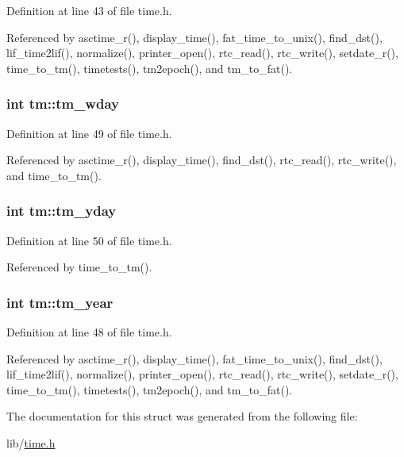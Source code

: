 Definition at line 43 of file time.\+h.



Referenced by asctime\+\_\+r(), display\+\_\+time(), fat\+\_\+time\+\_\+to\+\_\+unix(), find\+\_\+dst(), lif\+\_\+time2lif(), normalize(), printer\+\_\+open(), rtc\+\_\+read(), rtc\+\_\+write(), setdate\+\_\+r(), time\+\_\+to\+\_\+tm(), timetests(), tm2epoch(), and tm\+\_\+to\+\_\+fat().

\subsubsection[{\texorpdfstring{tm\+\_\+wday}{tm_wday}}]{\setlength{\rightskip}{0pt plus 5cm}int tm\+::tm\+\_\+wday}\hypertarget{structtm_afe81a8c46f1c693c43f259b288859f4f}{}\label{structtm_afe81a8c46f1c693c43f259b288859f4f}


Definition at line 49 of file time.\+h.



Referenced by asctime\+\_\+r(), display\+\_\+time(), find\+\_\+dst(), rtc\+\_\+read(), rtc\+\_\+write(), and time\+\_\+to\+\_\+tm().

\subsubsection[{\texorpdfstring{tm\+\_\+yday}{tm_yday}}]{\setlength{\rightskip}{0pt plus 5cm}int tm\+::tm\+\_\+yday}\hypertarget{structtm_a93a0ba77cc23796df84405dcbcc57eb1}{}\label{structtm_a93a0ba77cc23796df84405dcbcc57eb1}


Definition at line 50 of file time.\+h.



Referenced by time\+\_\+to\+\_\+tm().

\subsubsection[{\texorpdfstring{tm\+\_\+year}{tm_year}}]{\setlength{\rightskip}{0pt plus 5cm}int tm\+::tm\+\_\+year}\hypertarget{structtm_a33adf78fd6476b2120ce3b9c4a852053}{}\label{structtm_a33adf78fd6476b2120ce3b9c4a852053}


Definition at line 48 of file time.\+h.



Referenced by asctime\+\_\+r(), display\+\_\+time(), fat\+\_\+time\+\_\+to\+\_\+unix(), find\+\_\+dst(), lif\+\_\+time2lif(), normalize(), printer\+\_\+open(), rtc\+\_\+read(), rtc\+\_\+write(), setdate\+\_\+r(), time\+\_\+to\+\_\+tm(), timetests(), tm2epoch(), and tm\+\_\+to\+\_\+fat().



The documentation for this struct was generated from the following file\+:\begin{DoxyCompactItemize}
\item 
lib/\hyperlink{time_8h}{time.\+h}\end{DoxyCompactItemize}
